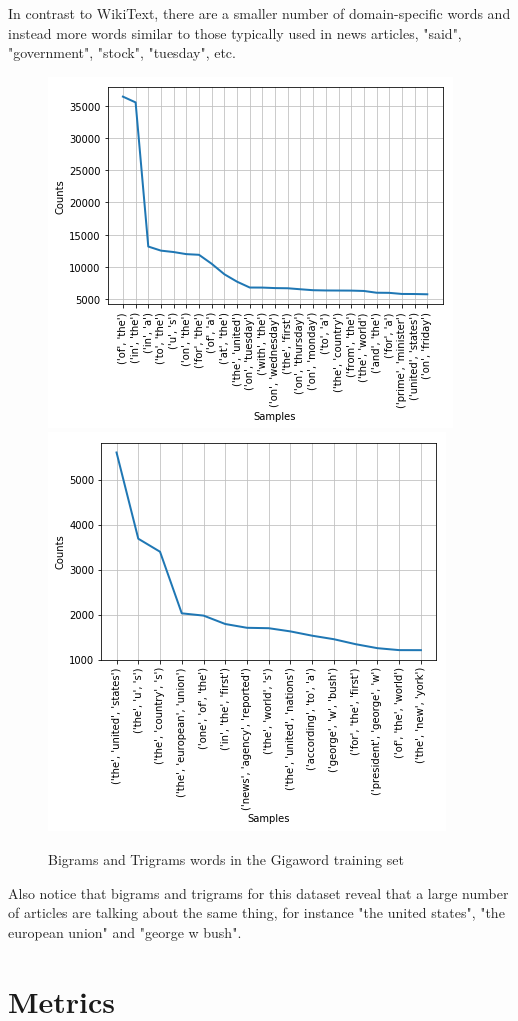 \documentclass[a4paper]{article}
\begin{document}
In contrast to WikiText, there are a smaller number of domain-specific
words and instead more words similar to those typically used in news
articles, "said", "government", "stock", "tuesday", etc.

\begin{figure}[!ht]
\includegraphics[width=0.7\columnwidth]{sr-eda-gigaword-bigrams}
\includegraphics[width=0.7\columnwidth]{sr-eda-gigaword-trigrams}
\centering
\caption{Bigrams and Trigrams words in the Gigaword training set}
\end{figure}

Also notice that bigrams and trigrams for this dataset reveal that a
large number of articles are talking about the same thing, for instance
"the united states", "the european union" and "george w bush".

\section{Metrics}
\label{sec:metrics}
\end{document}
